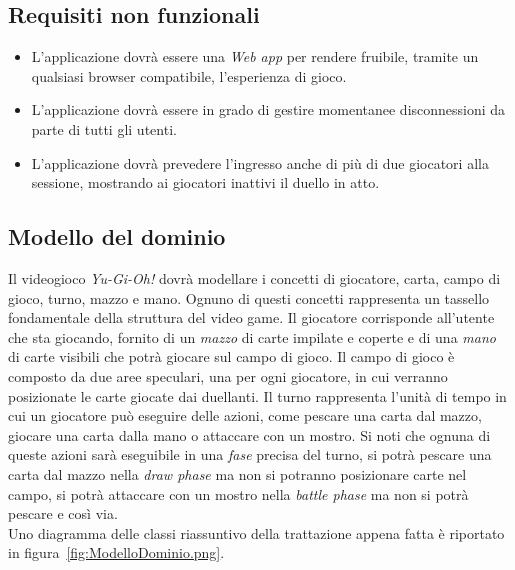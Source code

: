     \subsection{Requisiti non funzionali}\label{subsec:requisitiNonFunzionali}
        \begin{itemize}
            \item L'applicazione dovrà essere una \textit{Web app} per rendere fruibile, tramite un qualsiasi browser compatibile, l'esperienza di gioco.
            \item L'applicazione dovrà essere in grado di gestire momentanee disconnessioni da parte di tutti gli utenti.
            \item L'applicazione dovrà prevedere l'ingresso anche di più di due giocatori alla sessione, mostrando ai giocatori inattivi il duello in atto.
        \end{itemize}

    \subsection{Modello del dominio}
        Il videogioco \textit{Yu-Gi-Oh!} dovrà modellare i concetti di giocatore, carta, campo di gioco, turno, mazzo e mano. Ognuno di questi concetti rappresenta un tassello fondamentale
        della struttura del video game. Il giocatore corrisponde all'utente che sta giocando, fornito di un \textit{mazzo} di carte impilate e coperte e di una \textit{mano} di
        carte visibili che potrà giocare sul campo di gioco. Il campo di gioco è composto da due aree speculari, una per ogni giocatore, in cui verranno posizionate le carte giocate
        dai duellanti. Il turno rappresenta l'unità di tempo in cui un giocatore può eseguire delle azioni, come pescare una carta dal mazzo, giocare una carta dalla mano o attaccare
        con un mostro. Si noti che ognuna di queste azioni sarà eseguibile in una \textit{fase} precisa del turno, si potrà pescare una carta dal mazzo nella \textit{draw phase} ma
        non si potranno posizionare carte nel campo, si potrà attaccare con un mostro nella \textit{battle phase} ma non si potrà pescare e così via.\\
        Uno diagramma delle classi riassuntivo della trattazione appena fatta è riportato in figura~\ref{fig:ModelloDominio.png}.\\
    